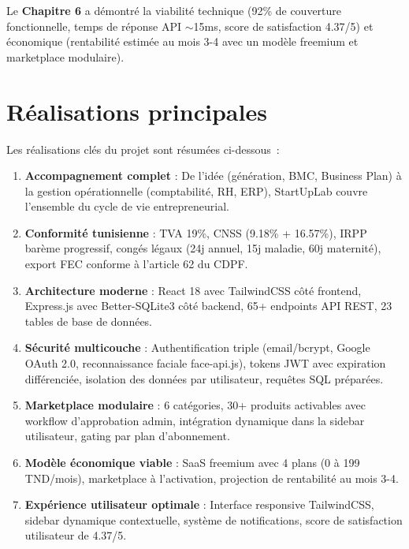 Le \textbf{Chapitre 6} a démontré la viabilité technique (92\% de couverture fonctionnelle, temps de réponse API $\sim$15ms, score de satisfaction 4.37/5) et économique (rentabilité estimée au mois 3-4 avec un modèle freemium et marketplace modulaire).

\section*{Réalisations principales}

Les réalisations clés du projet sont résumées ci-dessous~:

\begin{enumerate}
    \item \textbf{Accompagnement complet} : De l'idée (génération, BMC, Business Plan) à la gestion opérationnelle (comptabilité, RH, ERP), StartUpLab couvre l'ensemble du cycle de vie entrepreneurial.

    \item \textbf{Conformité tunisienne} : TVA 19\%, CNSS (9.18\% + 16.57\%), IRPP barème progressif, congés légaux (24j annuel, 15j maladie, 60j maternité), export FEC conforme à l'article 62 du CDPF.

    \item \textbf{Architecture moderne} : React 18 avec TailwindCSS côté frontend, Express.js avec Better-SQLite3 côté backend, 65+ endpoints API REST, 23 tables de base de données.

    \item \textbf{Sécurité multicouche} : Authentification triple (email/bcrypt, Google OAuth 2.0, reconnaissance faciale face-api.js), tokens JWT avec expiration différenciée, isolation des données par utilisateur, requêtes SQL préparées.

    \item \textbf{Marketplace modulaire} : 6 catégories, 30+ produits activables avec workflow d'approbation admin, intégration dynamique dans la sidebar utilisateur, gating par plan d'abonnement.

    \item \textbf{Modèle économique viable} : SaaS freemium avec 4 plans (0 à 199 TND/mois), marketplace à l'activation, projection de rentabilité au mois 3-4.

    \item \textbf{Expérience utilisateur optimale} : Interface responsive TailwindCSS, sidebar dynamique contextuelle, système de notifications, score de satisfaction utilisateur de 4.37/5.
\end{enumerate}

